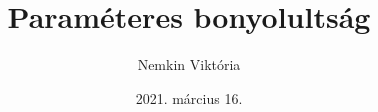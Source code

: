 \documentclass[aspectratio=169]{beamer}
\begin{document}
\title{Paraméteres bonyolultság}
\author{Nemkin Viktória}
\date{2021. március 16.}

\frame{\titlepage}

\end{document}
